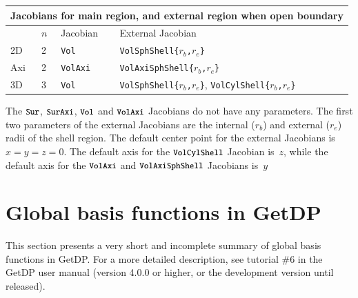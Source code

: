 \documentclass[letterpaper]{article}
\newcommand{\keyw}[1]{\texttt{\small #1}}
\begin{document}
\begin{table}
\centering
\begin{tabular}{llll}
\multicolumn{4}{c}{Jacobians for main region, and external region when open boundary} \\
\hline
 & $n$ & Jacobian & External Jacobian \\\hline
2D  & 2  & \keyw{Vol} & \keyw{VolSphShell\{}$r_b$\keyw{,}$r_e$\keyw{\}}  \\
Axi & 2  & \keyw{VolAxi} & \keyw{VolAxiSphShell\{}$r_b$\keyw{,}$r_e$\keyw{\}} \\
3D & 3  & \keyw{Vol} & \keyw{VolSphShell\{}$r_b$\keyw{,}$r_e$\keyw{\}}, \keyw{VolCylShell\{}$r_b$\keyw{,}$r_e$\keyw{\}} \\
\hline
\end{tabular}
\end{table}

The $\keyw{Sur}$, $\keyw{SurAxi}$, $\keyw{Vol}$ and $\keyw{VolAxi}$ Jacobians do not have any parameters. The first two parameters of the external Jacobians are the internal ($r_b$) and external ($r_e$) radii of the shell region. The default center point for the external Jacobians is $x=y=z=0$. The default axis for the $\keyw{VolCylShell}$ Jacobian is~$z$, while the default axis for the $\keyw{VolAxi}$ and $\keyw{VolAxiSphShell}$ Jacobians is~$y$





\clearpage
\section{Global basis functions in GetDP}
\label{sec_global}

This section presents a very short and incomplete summary of global basis functions in GetDP. For a more detailed description, see tutorial \#6 in the GetDP user manual (version 4.0.0 or higher, or the development version until released).
\end{document}
